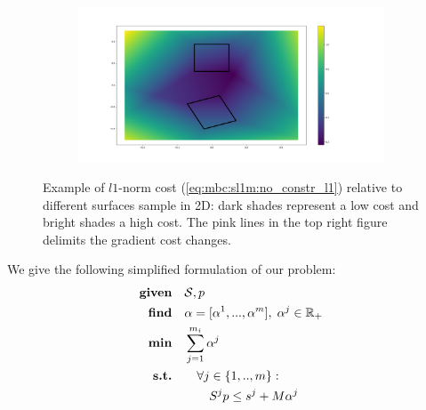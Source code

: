 \begin{figure}[ht]
\begin{subfigure}[t]{0.48\linewidth}
    \end{subfigure}
    \begin{subfigure}[t]{0.48\linewidth}
    \includegraphics[trim={5cm 2cm 12cm 2cm},clip,width=\textwidth]{Figures/Chapter_MIP_SL1M/l1_no_cst/grad_simple_rotate.png}
    \end{subfigure}
    \caption{Example of $l1$-norm cost (\ref{eq:mbc:sl1m:no_constr_l1}) relative to different surfaces sample in 2D: dark shades represent a low cost and bright shades a high cost. The pink lines in the top right figure delimits the gradient cost changes.}
    \label{fig:sl1m:no_constraint}
\end{figure}
We give the following simplified formulation of our problem:
\begin{align}
    \textrm{\textbf{given}} \quad & \mathcal{S}, p \nonumber\\
    \textrm{\textbf{find}}  %
                            \quad & \alpha=[\alpha^1,...,\alpha^m],\; \alpha^j \in \mathbb{R}_{+} \nonumber\\
    \textrm{\textbf{min}}  \quad & \sum_{j=1}^{m_i} \alpha^j \label{eq:mbc:sl1m:no_constr_l1}\\
    \textrm{\textbf{s.t.}}  \quad & \quad \forall j \in \{1,..,m\} : \nonumber\\
                            \quad & \quad \quad S^j p \leq s^j + M \alpha^j  \nonumber\\
                            \nonumber
\end{align}
